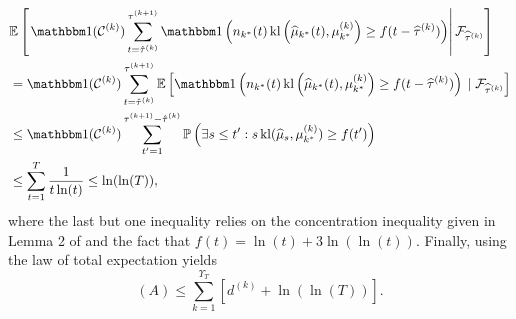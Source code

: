 \begin{align*}
    &\bE\left[\left.\indic(\cC^{(k)}) \sum_{t=\hat{\tau}^{(k)}}^{\tau^{(k+1)}} \indic\left(n_{k^*}(t) \, \kl\left(\widehat{\mu}_{k^*}(t), \mu_{k^*}^{(k)}\right) \geq f(t - \widehat{\tau}^{(k)})\right) \right| \cF_{\widehat{\tau}^{(k)}}\right]\\
    & = \indic(\cC^{(k)}) \sum_{t=\hat{\tau}^{(k)}}^{\tau^{(k+1)}} \bE\left[\indic\left(n_{k^*}(t) \, \kl\left(\widehat{\mu}_{k^*}(t), \mu_{k^*}^{(k)}\right) \geq f(t - \widehat{\tau}^{(k)})\right) \;|\; \cF_{\widehat{\tau}^{(k)}}\right] \\
    & \leq \indic(\cC^{(k)}) \sum_{t'=1}^{\tau^{(k+1)} - \hat{\tau}^{(k)}} \bP\left(\exists s \leq t' : s \, \kl(\widehat{\mu}_{s},\mu_{k^*}^{(k)}) \geq f(t')\right) \\
    & \leq \sum_{t=1}^T \frac{1}{t\ln(t)} \leq \ln(\ln(T)),
\end{align*}
%
where the last but one inequality relies on the concentration inequality given in Lemma 2 of \cite{KLUCBJournal} and the fact that $f(t) = \ln(t) + 3 \ln(\ln(t))$. Finally, using the law of total expectation yields
\begin{equation}\label{eq:6:TermAFinalGlobal}
    (A) \leq \sum_{k=1}^{\Upsilon_T}\left[d^{(k)} + \ln(\ln(T))\right].
\end{equation}

